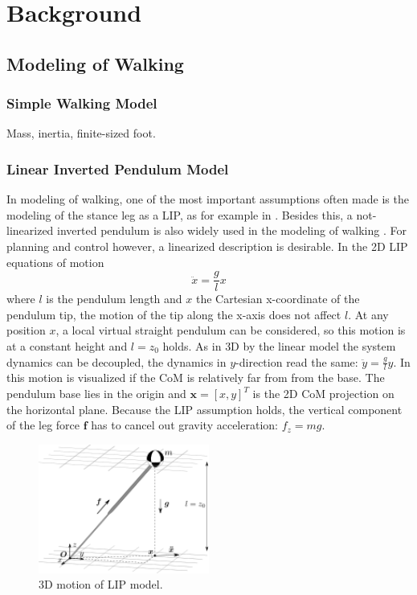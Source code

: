 %
\chapter{Background}

\section{Modeling of Walking}

\subsection{Simple Walking Model}
Mass, inertia, finite-sized foot.
\subsection{Linear Inverted Pendulum Model}
In modeling of walking, one of the most important assumptions often made is the modeling of the stance leg as a \acf{LIP}, as for example in \cite{kajita20013d}. Besides this, a not-linearized inverted pendulum is also widely used in the modeling of walking \cite{kuo2005energetic}. For planning and control however, a linearized description is desirable. In the \ac{2D} \ac{LIP} equations of motion
\begin{equation}
\ddot{x}=\frac{g}{l}x
\label{eq:LIPeom}
\end{equation}
where $l$ is the pendulum length and $x$ the Cartesian x-coordinate of the pendulum tip, the motion of the tip along the x-axis does not affect $l$. At any position $x$, a local virtual straight pendulum can be considered, so this motion is at a constant height and $l=z_0$  holds. As in \ac{3D} by the linear model the system dynamics can be decoupled, the dynamics in $y$-direction read the same: $\ddot{y}=\frac{g}{l} y$. In  this motion is visualized if the \ac{CoM} is relatively far from from the base. The pendulum base lies in the origin and $\boldsymbol{x} = [x,y]^T$ is the \ac{2D} \ac{CoM} projection on the horizontal plane. Because the \ac{LIP} assumption holds, the vertical component of the leg force $\boldsymbol{f}$ has to cancel out gravity acceleration: $f_z=mg$.
\begin{figure}[h]
\centering
\includegraphics[width=0.5\textwidth]{STYLESTUFF/3DCoMwithoutfoot.png}
\caption{\ac{3D} motion of \ac{LIP} model.}
\label{fig:3dlip}
\end{figure}
